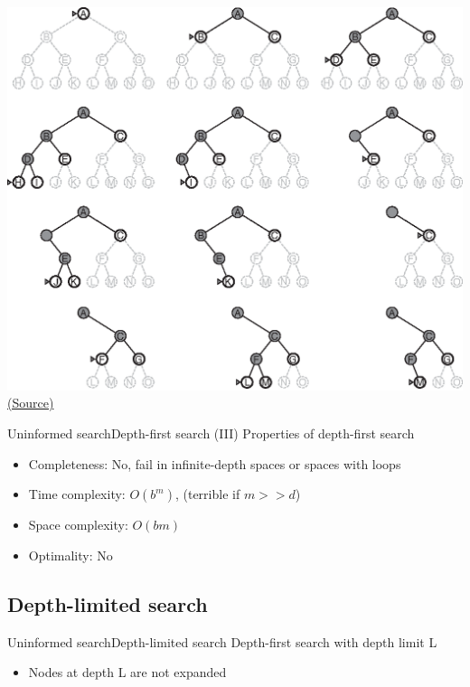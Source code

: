 \documentclass[10pt,compress]{beamer} %
\begin{document}
\begin{frame}[plain]
      \begin{center}
          \includegraphics[width=\linewidth]{figs/dfs-progress-noblack.eps}\\
          \tiny{\href{http://aima.cs.berkeley.edu/index.html}{(Source)}}
      \end{center}
\end{frame}

\begin{frame}{Uninformed search}{Depth-first search (III)}
      Properties of depth-first search
      \begin{itemize}
        \item Completeness: No, fail in infinite-depth spaces or spaces with loops
        \item Time complexity: $O(b^{m})$, (terrible if $m>>d$)
        \item Space complexity: $O(bm)$
        \item Optimality: No
      \end{itemize}
\end{frame}

\subsection{Depth-limited search}

\begin{frame}{Uninformed search}{Depth-limited search}
      Depth-first search with depth limit L
      \begin{itemize}
        \item Nodes at depth L are not expanded
      \end{itemize}
\end{frame}
\end{document}
